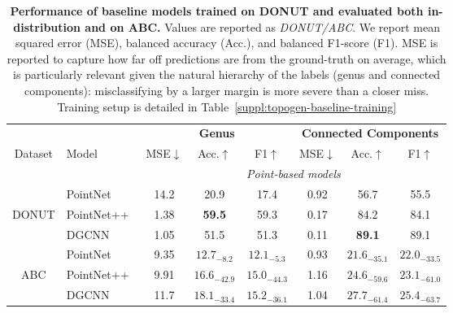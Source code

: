 \begin{table}[h]
\centering
\begin{tabular}{cl|ccc|ccc}
\toprule
 & & \multicolumn{3}{c|}{\textbf{Genus}} & \multicolumn{3}{c}{\textbf{Connected Components}} \\
Dataset & Model & MSE$\downarrow$ & Acc.$\uparrow$ & F1$\uparrow$ & MSE$\downarrow$ & Acc.$\uparrow$ & F1$\uparrow$ \\
\midrule
& \multicolumn{1}{l}{} & \multicolumn{6}{c}{\textit{Point-based models}} \\
\midrule
& PointNet~\cite{pointnet}   & 14.2 & 20.9 & 17.4 & 0.92 & 56.7 & 55.5 \\
DONUT &PointNet++~\cite{pointnet++} &  1.38 & \textbf{59.5} & 59.3 & 0.17 & 84.2 & 84.1 \\
& DGCNN~\cite{dgcnn}      & 1.05 & 51.5 & 51.3 & 0.11 & \textbf{89.1} & 89.1 \\
\midrule
& PointNet~\cite{pointnet}   & 9.35 & $12.7_{-8.2}$ & $12.1_{-5.3}$ & 0.93 & $21.6_{-35.1}$ & $22.0_{-33.5}$ \\
ABC &PointNet++~\cite{pointnet++} &  9.91 & $16.6_{-42.9}$ & $15.0_{-44.3}$ & 1.16 & $24.6_{-59.6}$ & $23.1_{-61.0}$ \\
& DGCNN~\cite{dgcnn}      & 11.7 & $18.1_{-33.4}$ & $15.2_{-36.1}$ & 1.04 & $27.7_{-61.4}$ & $25.4_{-63.7}$ \\
\bottomrule
\end{tabular}
\caption{\textbf{Performance of baseline models trained on DONUT and evaluated both in-distribution and on ABC.} Values are reported as \textit{DONUT/ABC}. We report mean squared error (MSE), balanced accuracy (Acc.), and balanced F1-score (F1). MSE is reported to capture how far off predictions are from the ground-truth on average, which is particularly relevant given the natural hierarchy of the labels (genus and connected components): misclassifying by a larger margin is more severe than a closer miss. Training setup is detailed in Table~\ref{suppl:topogen-baseline-training}}
\label{tab:topogen-results}
\end{table}